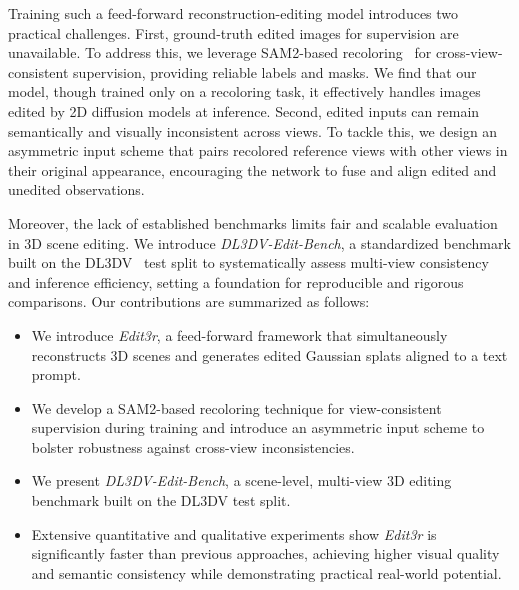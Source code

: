 \documentclass[10pt,twocolumn,letterpaper]{article}
\newcommand{\ourmethod}{\textit{Edit3r}}
\newcommand{\ourbench}{\textit{DL3DV-Edit-Bench}}
\begin{document}
Training such a feed-forward reconstruction-editing model introduces two practical challenges. First, ground-truth edited images for supervision are unavailable. To address this, we leverage SAM2-based recoloring~\cite{ravi2024sam} for cross-view-consistent supervision, providing reliable labels and masks. We find that our model, though trained only on a recoloring task, it effectively handles images edited by 2D diffusion models at inference. Second, edited inputs can remain semantically and visually inconsistent across views. To tackle this, we design an asymmetric input scheme that pairs recolored reference views with other views in their original appearance, encouraging the network to fuse and align edited and unedited observations.

Moreover, the lack of established benchmarks limits fair and scalable evaluation in 3D scene editing. We introduce {\ourbench}, a standardized benchmark built on the DL3DV~\cite{ling2023dl3dv10klargescalescenedataset} test split to systematically assess multi-view consistency and inference efficiency, setting a foundation for reproducible and rigorous comparisons.
%
Our contributions are summarized as follows:
\begin{itemize}
\item We introduce {\ourmethod}, a feed-forward framework that simultaneously reconstructs 3D scenes and generates edited Gaussian splats aligned to a text prompt.
\item We develop a SAM2-based recoloring technique for view-consistent supervision during training and introduce an asymmetric input scheme to bolster robustness against cross-view inconsistencies.
\item We present {\ourbench}, a scene-level, multi-view 3D editing benchmark built on the DL3DV test split.
\item Extensive quantitative and qualitative experiments show {\ourmethod} is significantly faster than previous approaches, achieving higher visual quality and semantic consistency while demonstrating practical real-world potential.
\end{itemize}
\end{document}
